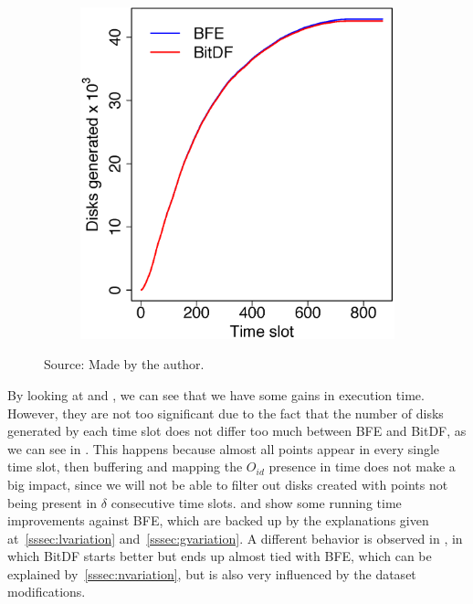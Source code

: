 {\begin{figure}[h!]
\begin{subfigure}[t]{0.48\textwidth}
        \includegraphics[width=\textwidth]{images/Trucks_d.eps}
        \label{fig:trucks_disks}
    \end{subfigure}
    \footnotesize{Source: Made by the author.}
    \label{fig:trucks_results2}
\end{figure}

By looking at  and , we can see that we have some gains in
execution time. However, they are not too significant due to the fact that the number of disks generated by each time
slot does not differ too much between BFE and BitDF, as we can see in . This happens because
almost all points appear in every single time slot, then buffering and mapping the $O_{id}$ presence in time does not
make a big impact, since we will not be able to filter out disks created with points not being present in $\delta$
consecutive time slots.   and  show some running time improvements
against BFE, which are backed up by the explanations given at~\ref{sssec:lvariation} and~\ref{sssec:gvariation}. A
different behavior is observed in , in which BitDF starts better but ends up almost tied with
BFE, which can be explained by~\ref{sssec:nvariation}, but is also very influenced by the dataset modifications.

}
